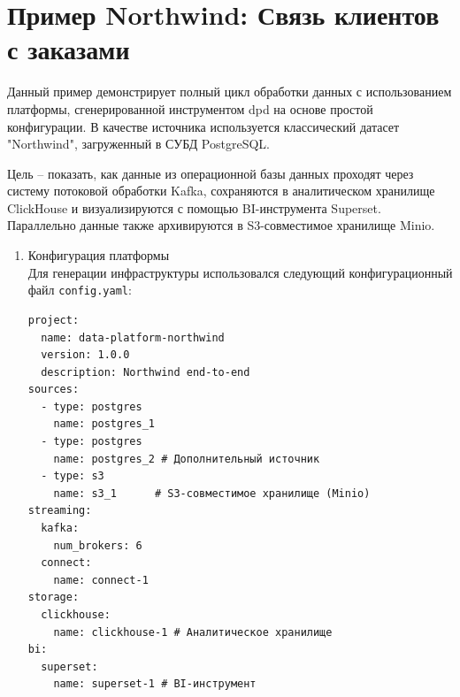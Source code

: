\section{Пример Northwind: Связь клиентов с заказами} \label{ch4:northwind}
Данный пример демонстрирует полный цикл обработки данных с использованием платформы, сгенерированной инструментом dpd на основе простой конфигурации. В качестве источника используется классический датасет "Northwind"\cite{northwind}, загруженный в СУБД PostgreSQL.

Цель – показать, как данные из операционной базы данных проходят через систему потоковой обработки Kafka, сохраняются в аналитическом хранилище ClickHouse и визуализируются с помощью BI-инструмента Superset. Параллельно данные также архивируются в S3-совместимое хранилище Minio.

\begin{enumerate}[1.]
  \item Конфигурация платформы\\
        Для генерации инфраструктуры использовался следующий конфигурационный файл \texttt{config.yaml}:
        \begin{verbatim}
project:
  name: data-platform-northwind 
  version: 1.0.0
  description: Northwind end-to-end
sources:
  - type: postgres
    name: postgres_1
  - type: postgres
    name: postgres_2 # Дополнительный источник
  - type: s3
    name: s3_1      # S3-совместимое хранилище (Minio)
streaming:
  kafka:
    num_brokers: 6
  connect:
    name: connect-1 
storage:
  clickhouse:
    name: clickhouse-1 # Аналитическое хранилище
bi:
  superset:
    name: superset-1 # BI-инструмент  
\end{verbatim}


\end{enumerate}
